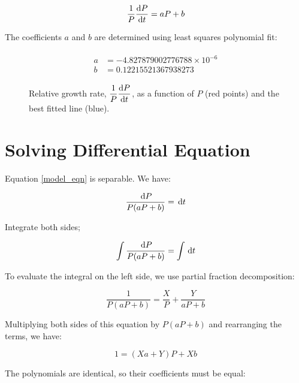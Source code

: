 \documentclass[12pt]{scrartcl}
\begin{document}
\begin{equation} \label{model_eqn}
\frac{1}{P} \diff{P}{t} = aP + b
\end{equation}

The coefficients $a$ and $b$ are determined using least squares polynomial fit:

\begin{align} \label{coef}
\begin{split}
a &= -4.827879002776788 \times 10^{-6} \\
b &= 0.12215521367938273
\end{split}
\end{align}

\begin{figure}[H]
  \centering
  \vspace*{-1cm}
  
  \caption{Relative growth rate, $\dfrac{1}{P} \displaystyle\diff{P}{t}$, as a
  function of $P$ (red points) and the best fitted line (blue).}
\end{figure}

\section*{Solving Differential Equation}

Equation \ref{model_eqn} is separable. We have:

\begin{equation}
\frac{\dl{P}}{P(aP + b)} = \dl{t}
\end{equation}

Integrate both sides;

\begin{equation} \label{int_eqn}
\int \frac{\dl{P}}{P(aP + b)} = \int \dl{t}
\end{equation}

To evaluate the integral on the left side, we use partial fraction decomposition:

\begin{equation*}
\frac{1}{P(aP + b)} = \frac{X}{P} + \frac{Y}{aP + b}
\end{equation*}

Multiplying both sides of this equation by $P(aP + b)$ and rearranging the terms, we have:

\begin{equation*}
1 = (Xa + Y)P + Xb
\end{equation*}

The polynomials are identical, so their coefficients must be equal:
\end{document}

